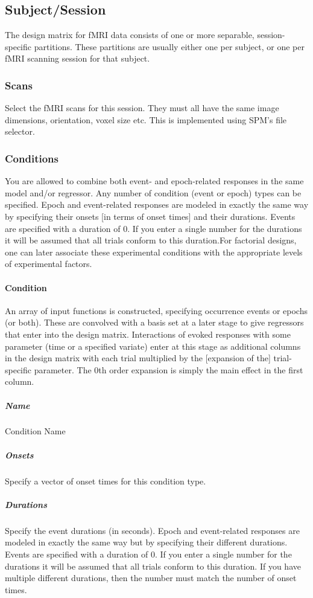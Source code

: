 \documentclass[a4paper,titlepage]{book}
\begin{document}
\subsection{Subject/Session}
The design matrix for fMRI data consists of one or more separable, session-specific partitions.  These partitions are usually either one per subject, or one per fMRI scanning session for that subject.


\subsubsection{Scans}
Select the fMRI scans for this session.  They must all have the same image dimensions, orientation, voxel size etc. This is implemented 
using SPM's file selector.


\subsubsection{Conditions}
You are allowed to combine both event- and epoch-related responses in the same model and/or regressor. Any number of condition (event or epoch) types can be specified.  Epoch and event-related responses are modeled in exactly the same way by specifying their onsets [in terms of onset times] and their durations.  Events are specified with a duration of 0.  If you enter a single number for the durations it will be assumed that all trials conform to this duration.For factorial designs, one can later associate these experimental conditions with the appropriate levels of experimental factors. 


\paragraph{Condition}
An array of input functions is constructed, specifying occurrence events or epochs (or both). These are convolved with a basis set at a later stage to give regressors that enter into the design matrix. Interactions of evoked responses with some parameter (time or a specified variate) enter at this stage as additional columns in the design matrix with each trial multiplied by the [expansion of the] trial-specific parameter. The 0th order expansion is simply the main effect in the first column.


\subparagraph{Name}
Condition Name


\subparagraph{Onsets}
Specify a vector of onset times for this condition type. 


\subparagraph{Durations}
Specify the event durations (in seconds). Epoch and event-related responses are modeled in exactly the same way but by specifying their different durations.  Events are specified with a duration of 0.  If you enter a single number for the durations it will be assumed that all trials conform to this duration. If you have multiple different durations, then the number must match the number of onset times.
\end{document}
